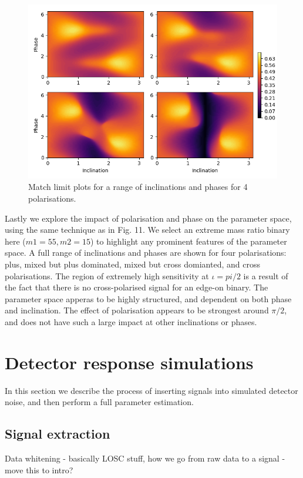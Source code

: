 \documentclass[11pt]{article}
\begin{document}
\begin{figure}
	\includegraphics[width=1\textwidth]{fig12.png}
	\centering
	\caption{Match limit plots for a range of inclinations and phases for 4 polarisations.}
	\centering
\end{figure}

Lastly we explore the impact of polarisation and phase on the parameter space, using the same technique as in Fig. 11. We select an extreme mass ratio binary here ($m1=55, m2=15$) to highlight any prominent features of the parameter space. A full range of inclinations and phases are shown for four polarisations: plus, mixed but plus dominated, mixed but cross domianted, and cross polarisations. The region of extremely high sensitivity at $\iota=pi/2$ is a result of the fact that there is no cross-polarised signal for an edge-on binary. The parameter space apperas to be highly structured, and dependent on both phase and inclination. The effect of polarisation appears to be strongest around $\pi/2$, and does not have such a large impact at other inclinations or phases.

\section{Detector response simulations}
In this section we describe the process of inserting signals into simulated detector noise, and then perform a full parameter estimation.
\subsection{Signal extraction}
Data whitening - basically LOSC stuff, how we go from raw data to a signal - move this to intro?
\end{document}
